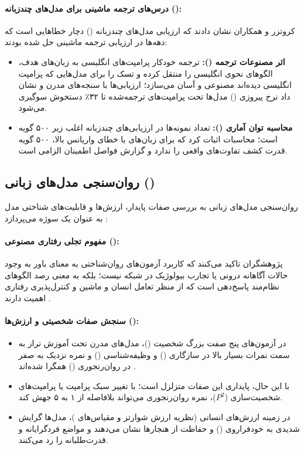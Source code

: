 \paragraph*{درس‌های ترجمه ماشینی برای مدل‌های چندزبانه ():}
کروتزر و همکاران نشان دادند که ارزیابی مدل‌های چندزبانه () دچار خطاهایی است که دهه‌ها در ارزیابی ترجمه ماشینی حل شده بودند:
\begin{itemize}
    \item \textbf{اثر مصنوعات ترجمه ():} ترجمه خودکار پرامپت‌های انگلیسی به زبان‌های هدف، الگوهای نحوی انگلیسی را منتقل کرده و تسک را برای مدل‌هایی که پرامپت انگلیسی دیده‌اند مصنوعی و آسان می‌سازد؛ ارزیابی‌ها با سنجه‌های مدرن  و  نشان داد نرخ پیروزی () مدل‌ها تحت پرامپت‌های ترجمه‌شده تا ۳۲٪ دستخوش سوگیری می‌شود.
    \item \textbf{محاسبه توان آماری ():} تعداد نمونه‌ها در ارزیابی‌های چندزبانه اغلب زیر ۵۰۰ گویه است؛ محاسبات اثبات کرد که برای زبان‌های با خطای واریانس بالا، ۵۰۰ گویه قدرت کشف تفاوت‌های واقعی را ندارد و گزارش فواصل اطمینان الزامی است.
\end{itemize}

\subsection*{روان‌سنجی مدل‌های زبانی ()}
روان‌سنجی مدل‌های زبانی به بررسی صفات پایدار، ارزش‌ها و قابلیت‌های شناختی مدل به عنوان یک سوژه می‌پردازد \cite{ye2025large, li2024evaluating}:

\paragraph*{مفهوم تجلی رفتاری مصنوعی ():}
پژوهشگران تاکید می‌کنند که کاربرد آزمون‌های روان‌شناختی به معنای باور به وجود حالات آگاهانه درونی یا تجارب بیولوژیک در شبکه نیست؛ بلکه به معنی رصد الگوهای نظام‌مند پاسخ‌دهی است که از منظر تعامل انسان و ماشین و کنترل‌پذیری رفتاری اهمیت دارند \cite{ye2025large}.

\paragraph*{سنجش صفات شخصیتی و ارزش‌ها ():}
\begin{itemize}
    \item در آزمون‌های پنج صفت بزرگ شخصیت ()، مدل‌های مدرن تحت آموزش تراز به سمت نمرات بسیار بالا در سازگاری () و وظیفه‌شناسی () و نمره نزدیک به صفر در روان‌رنجوری () همگرا شده‌اند \cite{li2024evaluating}.
    \item با این حال، پایداری این صفات متزلزل است؛ با تغییر سبک پرامپت یا پرامپت‌های شخصیت‌سازی ($P^2$)، نمره روان‌رنجوری می‌تواند بلافاصله از ۱ به ۵ جهش کند.
    \item در زمینه ارزش‌های انسانی (نظریه ارزش شوارتز و مقیاس‌های )، مدل‌ها گرایش شدیدی به خودفراروی () و حفاظت از هنجارها نشان می‌دهند و مواضع فردگرایانه و قدرت‌طلبانه را رد می‌کنند.
\end{itemize}

